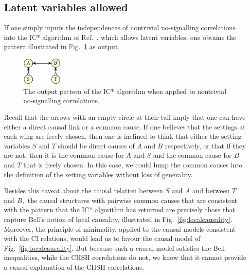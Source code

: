 \documentclass[letterpaper,onecolumn,nofootinbib]{revtex4}
\begin{document}
\subsection{Latent variables allowed}
\label{sec:qcor-hvar}

If one simply inputs the independences of nontrivial no-signalling
correlations into the IC* algorithm of Ref.~\cite{Pearl2009}, which allows latent variables, one obtains the pattern illustrated in Fig.~\ref{fig:bell-ics} as output.

\begin{figure}[h]
	\centering
	\includegraphics[width=0.18\textwidth]{bell-ics}
 \caption{The output pattern of the IC* algorithm when applied to nontrivial no-signalling correlations.}
       \label{fig:bell-ics}
\end{figure}

Recall that the arrows with an empty circle at their tail imply
that one can have either a direct causal link or a common cause.
If one believes that the settings at each wing are freely chosen, then one
is inclined to think that either the setting variables $S$ and $T$ should
be direct causes of $A$ and $B$ respectively, or that if they are not, then it is
the common cause for $A$ and $S$ and the common cause for $B$ and $T$ that is freely chosen.
In this case, we could lump the common causes into the definition of the setting variables without loss of generality.

Besides this caveat about the causal relation between $S$ and $A$ and between
$T$ and $B,$ the causal structures with pairwise common causes that are consistent with the pattern that the IC* algorithm has returned are
precisely those that capture Bell's notion of local causality, illustrated in Fig.~\ref{fig:localcausality}.  Moreover, the principle of minimality, applied to the causal models consistent with the CI relations, would lead us to favour the causal model of Fig.~\ref{fig:localcausality}.    But because such a causal model satisfies the Bell inequalities, while the CHSH correlations do not, we know that it cannot provide a causal explanation of the CHSH correlations. 
\end{document}
